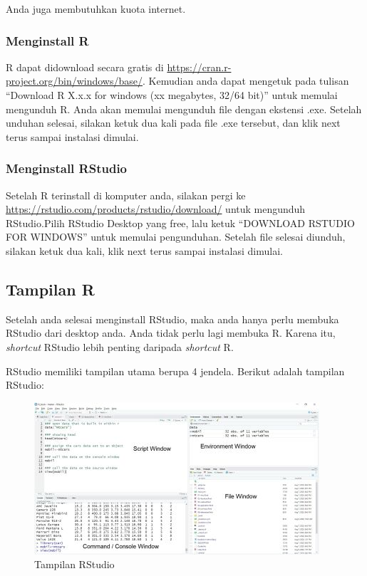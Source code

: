 \documentclass[
]{book}
\begin{document}
Anda juga membutuhkan kuota internet.

\hypertarget{menginstall-r}{%
\subsubsection{Menginstall R}\label{menginstall-r}}

R dapat didownload secara gratis di \url{https://cran.r-project.org/bin/windows/base/}. Kemudian anda dapat mengetuk pada tulisan ``Download R X.x.x for windows (xx megabytes, 32/64 bit)'' untuk memulai mengunduh R. Anda akan memulai mengunduh file dengan ekstensi .exe. Setelah unduhan selesai, silakan ketuk dua kali pada file .exe tersebut, dan klik next terus sampai instalasi dimulai.

\hypertarget{menginstall-rstudio}{%
\subsubsection{Menginstall RStudio}\label{menginstall-rstudio}}

Setelah R terinstall di komputer anda, silakan pergi ke \url{https://rstudio.com/products/rstudio/download/} untuk mengunduh RStudio.Pilih RStudio Desktop yang free, lalu ketuk ``DOWNLOAD RSTUDIO FOR WINDOWS'' untuk memulai pengunduhan. Setelah file selesai diunduh, silakan ketuk dua kali, klik next terus sampai instalasi dimulai.

\hypertarget{tampilan-r}{%
\subsection{Tampilan R}\label{tampilan-r}}

Setelah anda selesai menginstall RStudio, maka anda hanya perlu membuka RStudio dari desktop anda. Anda tidak perlu lagi membuka R. Karena itu, \emph{shortcut} RStudio lebih penting daripada \emph{shortcut} R.

RStudio memiliki tampilan utama berupa 4 jendela. Berikut adalah tampilan RStudio:

\begin{figure}
\centering
\includegraphics{tampilanR2.JPG}
\caption{\label{fig:unnamed-chunk-1}Tampilan RStudio}
\end{figure}
\end{document}
